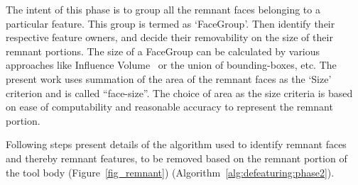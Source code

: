 The intent of this phase is to group all the remnant faces belonging to a particular feature. This group is termed as `FaceGroup'. Then identify their respective feature owners, and decide their removability on the size of their remnant portions. The size of a FaceGroup can be calculated by various approaches like Influence Volume~\cite{SangHunLee2005} or the union of bounding-boxes, etc. The present work uses summation of the area of the remnant faces as the `Size' criterion and is called ``face-size''. The choice of area as the size criteria is based on ease of computability and reasonable accuracy to represent the remnant portion. 



Following steps present details of the algorithm used to identify remnant faces and thereby remnant features, to be removed based on the remnant portion of the tool body (Figure~\ref{fig_remnant}) (Algorithm~\ref{alg:defeaturing:phase2}).

